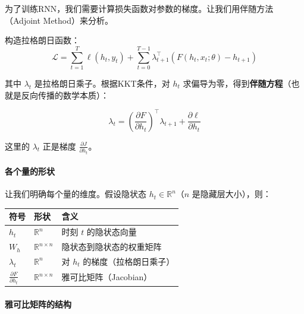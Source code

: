 为了训练RNN，我们需要计算损失函数对参数的梯度。让我们用伴随方法（Adjoint Method）来分析。

构造拉格朗日函数：
\begin{equation}
    \mathcal{L} = \sum_{t=1}^{T} \ell(h_t, y_t) + \sum_{t=0}^{T-1} \lambda_{t+1}^\top \left( F(h_t, x_t; \theta) - h_{t+1} \right)
\end{equation}

其中 $\lambda_t$ 是拉格朗日乘子。根据KKT条件，对 $h_t$ 求偏导为零，得到\textbf{伴随方程}（也就是反向传播的数学本质）：

\begin{equation}
    \lambda_t = \left( \frac{\partial F}{\partial h_t} \right)^\top \lambda_{t+1} + \frac{\partial \ell}{\partial h_t}
\end{equation}

这里的 $\lambda_t$ 正是梯度 $\frac{\partial J}{\partial h_t}$。

\paragraph{各个量的形状}

让我们明确每个量的维度。假设隐状态 $h_t \in \mathbb{R}^n$（$n$ 是隐藏层大小），则：

\begin{table}[htbp]
\centering
\renewcommand{\arraystretch}{1.3}
\begin{tabular}{lll}
\toprule
符号 & 形状 & 含义 \\
\midrule
$h_t$ & $\mathbb{R}^n$ & 时刻 $t$ 的隐状态向量 \\
$W_h$ & $\mathbb{R}^{n \times n}$ & 隐状态到隐状态的权重矩阵 \\
$\lambda_t$ & $\mathbb{R}^n$ & 对 $h_t$ 的梯度（拉格朗日乘子） \\
$\frac{\partial F}{\partial h_t}$ & $\mathbb{R}^{n \times n}$ & 雅可比矩阵（Jacobian） \\
\bottomrule
\end{tabular}
\end{table}

\paragraph{雅可比矩阵的结构}

